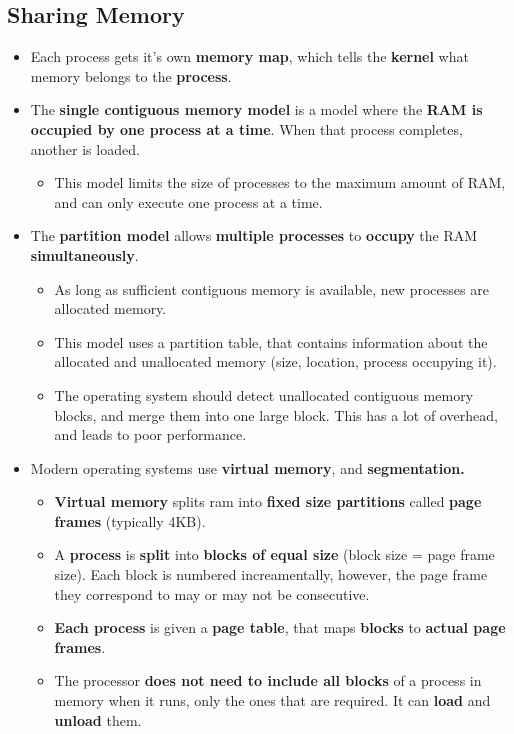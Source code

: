 \documentclass{article}
\begin{document}
    \subsection*{Sharing Memory}
    \begin{itemize}
        \item Each process gets it's own \textbf{memory map}, which tells the \textbf{kernel} what memory belongs to the \textbf{process}.
        \item The \textbf{single contiguous memory model} is a model where the \textbf{RAM is occupied by one process at a time}. When that process completes, another is loaded.
        \begin{itemize}
            \item This model limits the size of processes to the maximum amount of RAM, and can only execute one process at a time.
        \end{itemize}
        \item The \textbf{partition model} allows \textbf{multiple processes} to \textbf{occupy} the RAM \textbf{simultaneously}.
        \begin{itemize}
            \item As long as sufficient contiguous memory is available, new processes are allocated memory.
            \item This model uses a partition table, that contains information about the allocated and unallocated memory (size, location, process occupying it).
            \item The operating system should detect unallocated contiguous memory blocks, and merge them into one large block. This has a lot of overhead, and leads to poor performance.
        \end{itemize}
        \item Modern operating systems use \textbf{virtual memory}, and \textbf{segmentation.}
        \begin{itemize}
            \item \textbf{Virtual memory} splits ram into \textbf{fixed size partitions} called \textbf{page frames} (typically 4KB).
            \item A \textbf{process} is \textbf{split} into \textbf{blocks of equal size} (block size = page frame size). Each block is numbered increamentally, however, the page frame they correspond to may or may not be consecutive.
            \item \textbf{Each process} is given a \textbf{page table}, that maps \textbf{blocks} to \textbf{actual page frames}.
            \item The processor \textbf{does not need to include all blocks} of a process in memory when it runs, only the ones that are required. It can \textbf{load} and \textbf{unload} them. 
        \end{itemize}
    \end{itemize}
\end{document}
